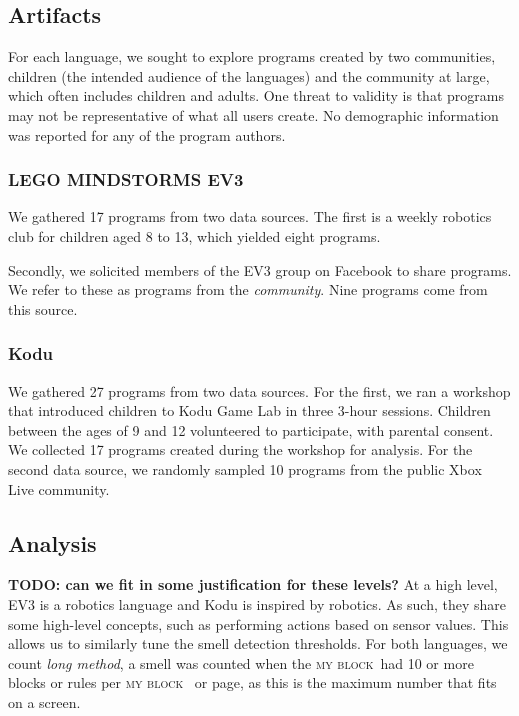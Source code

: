 \documentclass[conference]{IEEEtran}
\newcommand{\ms}{LEGO MINDSTORMS EV3}
\newcommand{\mb}{\textsc{my block}}
\newcommand{\todo}[1]{\textbf{#1}}
\begin{document}
\subsection{Artifacts}
For each language, we sought to explore programs created by two communities, children (the intended audience of the languages) and the community at large, which often includes children and adults. One threat to validity is that programs may not be representative of what all users create. No demographic information was reported for any of the program authors. 

\subsubsection{\ms}
We  gathered 17 programs from two data sources. The first is a weekly robotics club for children aged 8 to 13, which yielded eight programs. 

Secondly, we solicited members of the EV3 group on Facebook to share programs. We refer to these as programs from the \emph{community}. Nine programs come from this source. 


\subsubsection{Kodu}
We gathered 27  programs from two data sources. 
For the first, we ran a workshop that introduced children to Kodu Game Lab in three 3-hour sessions.  
Children between the ages of 9 and 12 volunteered to participate, with parental consent. We collected 17 programs created during the workshop for analysis. 
For the second data source, we randomly sampled 10 programs from the public Xbox Live community. 



\subsection{Analysis}
\todo{TODO: can we fit in some justification for these levels?} At a high level, EV3 is a robotics language and Kodu is inspired by robotics. As such, they share some high-level concepts, such as performing actions based on sensor values. This allows us to similarly tune the smell detection thresholds. For both languages, we count \emph{long method}, a smell was counted when the \mb~had 10 or more blocks or rules per \mb~ or page, as this is the maximum number that fits on a screen.
\end{document}

